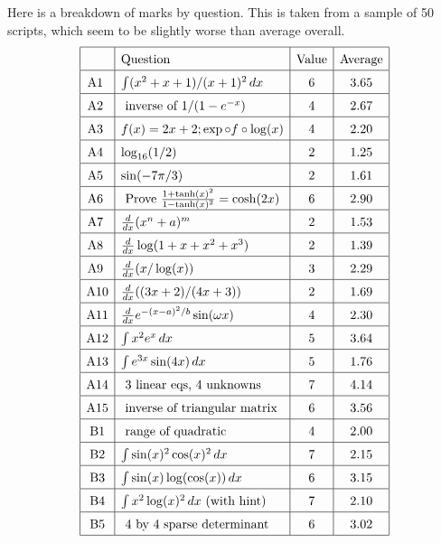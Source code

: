 \documentclass{amsart}
\begin{document}


Here is a breakdown of marks by question.  This is taken from a sample
of 50 scripts, which seem to be slightly worse than average overall.
\[ \renewcommand{\arraystretch}{1.5}\begin{array}{|c|l|c|c|}\hline
& \text{Question} & \text{Value} & \text{Average} \\ \hline
\text{A1 } & \int (x^2+x+1)/(x+1)^2\,dx         & 6 & 3.65 \\ \hline
\text{A2 } & \text{ inverse of } 1/(1-e^{-x})   & 4 & 2.67 \\ \hline
\text{A3 } & f(x)=2x+2; \exp\circ f\circ\log(x) & 4 & 2.20 \\ \hline
\text{A4 } & \log_{16}(1/2)                     & 2 & 1.25 \\ \hline
\text{A5 } & \sin(-7\pi/3)                      & 2 & 1.61 \\ \hline
\text{A6 } & \text{ Prove }
             \frac{1+\tanh(x)^2}{1-\tanh(x)^2} 
             = \cosh(2x)                        & 6 & 2.90 \\ \hline
\text{A7 } & \frac{d}{dx}(x^n+a)^m              & 2 & 1.53 \\ \hline
\text{A8 } & \frac{d}{dx}\log(1+x+x^2+x^3)      & 2 & 1.39 \\ \hline
\text{A9 } & \frac{d}{dx}(x/\log(x))            & 3 & 2.29 \\ \hline
\text{A10} & \frac{d}{dx}((3x+2)/(4x+3))        & 2 & 1.69 \\ \hline
\text{A11} & \frac{d}{dx}e^{-(x-a)^2/b}\sin(\omega x)& 4 & 2.30 \\ \hline
\text{A12} & \int x^2e^x\,dx                    & 5 & 3.64 \\ \hline
\text{A13} & \int e^{3x}\sin(4x)\,dx            & 5 & 1.76 \\ \hline
\text{A14} & \text{ 3 linear eqs, 4 unknowns }  & 7 & 4.14 \\ \hline
\text{A15} & \text{ inverse of triangular matrix }& 6 & 3.56 \\ \hline
\text{B1}  & \text{ range of quadratic }        & 4 & 2.00 \\ \hline
\text{B2}  & \int\sin(x)^2\cos(x)^2\,dx         & 7 & 2.15 \\ \hline
\text{B3}  & \int\sin(x)\log(\cos(x))\,dx       & 6 & 3.15 \\ \hline
\text{B4}  & \int x^2\log(x)^2\,dx \text{ (with hint) }& 7 & 2.10 \\ \hline
\text{B5}  & \text{ 4 by 4 sparse determinant } & 6 & 3.02 \\ \hline
\end{array}
\]
\end{document}
